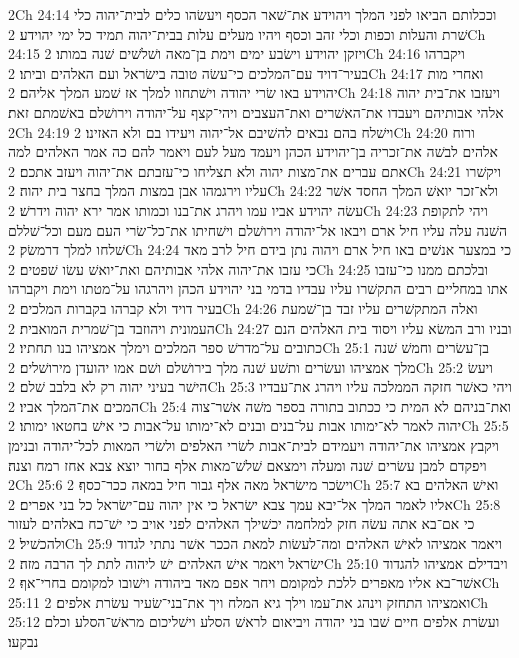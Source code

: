 2Ch 24:14  וככלותם הביאו לפני המלך ויהוידע את־שׁאר הכסף ויעשׂהו כלים לבית־יהוה כלי שׁרת והעלות וכפות וכלי זהב וכסף ויהיו מעלים עלות בבית־יהוה תמיד כל ימי יהוידע׃
2Ch 24:15  ויזקן יהוידע וישׂבע ימים וימת בן־מאה ושׁלשׁים שׁנה במותו׃
2Ch 24:16  ויקברהו בעיר־דויד עם־המלכים כי־עשׂה טובה בישׂראל ועם האלהים וביתו׃
2Ch 24:17  ואחרי מות יהוידע באו שׂרי יהודה וישׁתחוו למלך אז שׁמע המלך אליהם׃
2Ch 24:18  ויעזבו את־בית יהוה אלהי אבותיהם ויעבדו את־האשׁרים ואת־העצבים ויהי־קצף על־יהודה וירושׁלם באשׁמתם זאת׃
2Ch 24:19  וישׁלח בהם נבאים להשׁיבם אל־יהוה ויעידו בם ולא האזינו׃
2Ch 24:20  ורוח אלהים לבשׁה את־זכריה בן־יהוידע הכהן ויעמד מעל לעם ויאמר להם כה אמר האלהים למה אתם עברים את־מצות יהוה ולא תצליחו כי־עזבתם את־יהוה ויעזב אתכם׃
2Ch 24:21  ויקשׁרו עליו וירגמהו אבן במצות המלך בחצר בית יהוה׃
2Ch 24:22  ולא־זכר יואשׁ המלך החסד אשׁר עשׂה יהוידע אביו עמו ויהרג את־בנו וכמותו אמר ירא יהוה וידרשׁ׃
2Ch 24:23  ויהי לתקופת השׁנה עלה עליו חיל ארם ויבאו אל־יהודה וירושׁלם וישׁחיתו את־כל־שׂרי העם מעם וכל־שׁללם שׁלחו למלך דרמשׂק׃
2Ch 24:24  כי במצער אנשׁים באו חיל ארם ויהוה נתן בידם חיל לרב מאד כי עזבו את־יהוה אלהי אבותיהם ואת־יואשׁ עשׂו שׁפטים׃
2Ch 24:25  ובלכתם ממנו כי־עזבו אתו במחליים רבים התקשׁרו עליו עבדיו בדמי בני יהוידע הכהן ויהרגהו על־מטתו וימת ויקברהו בעיר דויד ולא קברהו בקברות המלכים׃
2Ch 24:26  ואלה המתקשׁרים עליו זבד בן־שׁמעת העמונית ויהוזבד בן־שׁמרית המואבית׃
2Ch 24:27  ובניו ורב המשׂא עליו ויסוד בית האלהים הנם כתובים על־מדרשׁ ספר המלכים וימלך אמציהו בנו תחתיו׃
2Ch 25:1  בן־עשׂרים וחמשׁ שׁנה מלך אמציהו ועשׂרים ותשׁע שׁנה מלך בירושׁלם ושׁם אמו יהועדן מירושׁלים׃
2Ch 25:2  ויעשׂ הישׁר בעיני יהוה רק לא בלבב שׁלם׃
2Ch 25:3  ויהי כאשׁר חזקה הממלכה עליו ויהרג את־עבדיו המכים את־המלך אביו׃
2Ch 25:4  ואת־בניהם לא המית כי ככתוב בתורה בספר משׁה אשׁר־צוה יהוה לאמר לא־ימותו אבות על־בנים ובנים לא־ימותו על־אבות כי אישׁ בחטאו ימותו׃
2Ch 25:5  ויקבץ אמציהו את־יהודה ויעמידם לבית־אבות לשׂרי האלפים ולשׂרי המאות לכל־יהודה ובנימן ויפקדם למבן עשׂרים שׁנה ומעלה וימצאם שׁלשׁ־מאות אלף בחור יוצא צבא אחז רמח וצנה׃
2Ch 25:6  וישׂכר מישׂראל מאה אלף גבור חיל במאה ככר־כסף׃
2Ch 25:7  ואישׁ האלהים בא אליו לאמר המלך אל־יבא עמך צבא ישׂראל כי אין יהוה עם־ישׂראל כל בני אפרים׃
2Ch 25:8  כי אם־בא אתה עשׂה חזק למלחמה יכשׁילך האלהים לפני אויב כי ישׁ־כח באלהים לעזור ולהכשׁיל׃
2Ch 25:9  ויאמר אמציהו לאישׁ האלהים ומה־לעשׂות למאת הככר אשׁר נתתי לגדוד ישׂראל ויאמר אישׁ האלהים ישׁ ליהוה לתת לך הרבה מזה׃
2Ch 25:10  ויבדילם אמציהו להגדוד אשׁר־בא אליו מאפרים ללכת למקומם ויחר אפם מאד ביהודה וישׁובו למקומם בחרי־אף׃
2Ch 25:11  ואמציהו התחזק וינהג את־עמו וילך גיא המלח ויך את־בני־שׂעיר עשׂרת אלפים׃
2Ch 25:12  ועשׂרת אלפים חיים שׁבו בני יהודה ויביאום לראשׁ הסלע וישׁליכום מראשׁ־הסלע וכלם נבקעו׃
